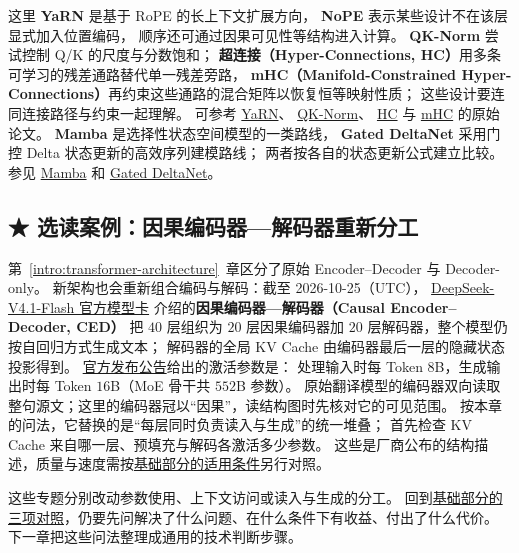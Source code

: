 \label{concept:yarn}这里 \textbf{YaRN} 是基于 RoPE 的长上下文扩展方向，
\textbf{NoPE} 表示某些设计不在该层显式加入位置编码，
顺序还可通过因果可见性等结构进入计算。
\label{concept:qk-norm}\textbf{QK-Norm} 尝试控制 Q/K 的尺度与分数饱和；
\textbf{超连接（Hyper-Connections, HC）}用多条可学习的残差通路替代单一残差旁路，
\textbf{mHC（Manifold-Constrained Hyper-Connections）}再约束这些通路的混合矩阵以恢复恒等映射性质；
这些设计要连同连接路径与约束一起理解。
可参考
\hyperref[source:yarn]{YaRN}、
\hyperref[source:qk-norm]{QK-Norm}、
\href{https://arxiv.org/abs/2409.19606}{HC}
与 \hyperref[source:mhc]{mHC} 的原始论文。
\label{concept:mamba}\textbf{Mamba} 是选择性状态空间模型的一类路线，
\textbf{Gated DeltaNet} 采用门控 Delta 状态更新的高效序列建模路线；
两者按各自的状态更新公式建立比较。
参见 \hyperref[source:mamba]{Mamba} 和
\hyperref[source:gated-delta]{Gated DeltaNet}。

\subsection{\texorpdfstring{{\symboliconfont ★}}{★} 选读案例：因果编码器—解码器重新分工}
\label{elective:causal-encoder-decoder}

第~\ref*{intro:transformer-architecture}~章区分了原始 Encoder--Decoder 与 Decoder-only。
新架构也会重新组合编码与解码：截至 2026-10-25（UTC），
\href{https://huggingface.co/deepseek-ai/DeepSeek-V4.1-Flash}{DeepSeek-V4.1-Flash 官方模型卡}
介绍的\textbf{因果编码器—解码器（Causal Encoder--Decoder, CED）}
把 $40$ 层组织为 $20$ 层因果编码器加 $20$ 层解码器，整个模型仍按自回归方式生成文本；
解码器的全局 KV Cache 由编码器最后一层的隐藏状态投影得到。
\href{https://www.deepseek.com/en/news/deepseek-v4-1-flash/}{官方发布公告}给出的激活参数是：
处理输入时每 Token $8$B，生成输出时每 Token $16$B（MoE 骨干共 $552$B 参数）。
原始翻译模型的编码器双向读取整句源文；这里的编码器冠以“因果”，读结构图时先核对它的可见范围。
按本章的问法，它替换的是“每层同时负责读入与生成”的统一堆叠；
首先检查 KV Cache 来自哪一层、预填充与解码各激活多少参数。
这些是厂商公布的结构描述，质量与速度需按\hyperref[sec:modern-core-comparison]{基础部分的适用条件}另行对照。

\par\smallskip
这些专题分别改动参数使用、上下文访问或读入与生成的分工。
回到\hyperref[sec:modern-core-comparison]{基础部分的三项对照}，仍要先问解决了什么问题、在什么条件下有收益、付出了什么代价。
下一章把这些问法整理成通用的技术判断步骤。
